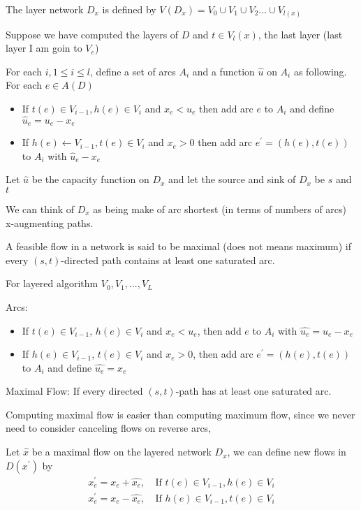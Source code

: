 			The layer network $D_x$ is defined by $V(D_x) = V_0 \cup V_1 \cup V_2 \dots \cup V_{l(x)}$

			Suppose we have computed the layers of $D$ and $t \in V_l(x)$, the last layer (last layer I am goin to $V_e$)

			For each $i, 1 \le i \le l$, define a set of arcs $A_i$ and a function $\hat{u}$ on $A_i$ as following. For each $e\in A(D)$
			\begin{itemize}
				\item If $t(e) \in V_{i-1}, h(e) \in V_i$ and $x_e < u_e$ then add arc $e$ to $A_i$ and define $\hat{u}_e = u_e - x_e$
				\item If $h(e) \gets V_{i-1}, t(e) \in V_i$ and $x_e > 0$ then add arc $e^\prime = (h(e), t(e))$ to $A_i$ with $\hat{u}_e - x_e$
			\end{itemize}

			Let $\hat{u}$ be the capacity function on $D_x$ and let the source and sink of $D_x$ be $s$ and $t$

			We can think of $D_x$ as being make of arc shortest (in terms of numbers of arcs) x-augmenting paths.

			A feasible flow in a network is said to be maximal (does not means maximum) if every $(s, t)$-directed path contains at least one saturated arc.

			For layered algorithm $V_0, V_1, ..., V_L$

			Arcs:
			\begin{itemize}
				\item If $t(e)\in V_{i-1}$, $h(e) \in V_i$ and $x_e < u_e$, then add $e$ to $A_i$ with $\hat{u_e} = u_e - x_e$
				\item If $h(e) \in V_{i-1}$, $t(e)\in V_i$ and $x_e > 0$, then add arc $e^\prime = (h(e), t(e))$ to $A_i$ and define $\hat{u_e} = x_e$
			\end{itemize}

			Maximal Flow: If every directed $(s, t)$-path has at least one saturated arc.

			Computing maximal flow is easier than computing maximum flow, since we never need to consider canceling flows on reverse arcs,

			Let $\hat{x}$ be a maximal flow on the layered network $D_x$, we can define new flows in $D(x^\prime)$ by
			\begin{align}
				x_e^\prime = x_e + \hat{x_e}, \quad \text{If } t(e) \in V_{i-1}, h(e)\in V_i\\
				x_e^\prime = x_e - \hat{x_e}, \quad \text{If } h(e) \in V_{i-1}, t(e)\in V_i
			\end{align}

